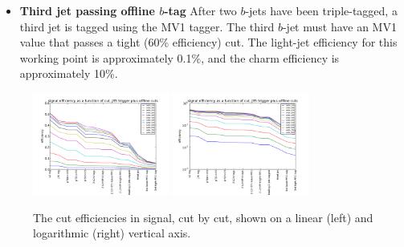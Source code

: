 \begin{itemize}
\item
\textbf{Third jet passing offline $b$-tag}
After two
$b$-jets have been triple-tagged, a third jet is tagged using the MV1 tagger.  The third
$b$-jet must have an MV1 value that passes a tight (60\% efficiency)
cut.  The light-jet efficiency for this working point is approximately 0.1\%, and the
charm efficiency is approximately 10\%.

\end{itemize}



\begin{figure}
	\includegraphics[width=0.4\textwidth]{TriggerCuts/cut_efficiencies_j35_signal.pdf}	
	\includegraphics[width=0.4\textwidth]{TriggerCuts/cut_efficiencies_logy_j35_signal.pdf}	
    \caption{The cut efficiencies in signal, cut by cut, shown on a linear (left) and logarithmic (right) vertical axis. \label{fig:signal_eff_cutflow}}
\end{figure}






